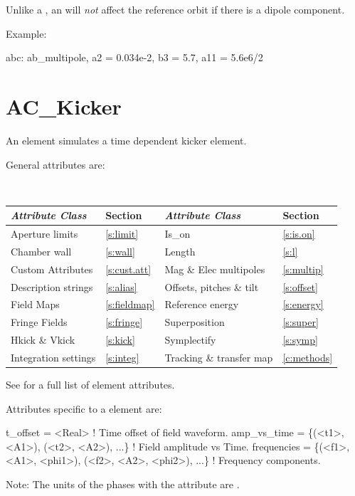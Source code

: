 Unlike a , an  will {\em not} affect the
reference orbit if there is a dipole component. 

Example:
\begin{example}
  abc: ab_multipole, a2 = 0.034e-2, b3 = 5.7, a11 = 5.6e6/2
\end{example}

\section{AC_Kicker}
\label{s:ac.kick}

An  element simulates a time dependent kicker element.

General  attributes are:
\begin{center}
\tt
\begin{tabular}{llll} \toprule
  {\sl Attribute Class}      & Section           & {\sl Attribute Class}      & Section         \\ \midrule
  Aperture limits            & \ref{s:limit}     & Is_on                      & \ref{s:is.on}   \\
  Chamber wall               & \ref{s:wall}      & Length                     & \ref{s:l}       \\
  Custom Attributes          & \ref{s:cust.att}  & Mag \& Elec multipoles     & \ref{s:multip}  \\
  Description strings        & \ref{s:alias}     & Offsets, pitches \& tilt   & \ref{s:offset}  \\
  Field Maps                 & \ref{s:fieldmap}  & Reference energy           & \ref{s:energy}  \\ 
  Fringe Fields              & \ref{s:fringe}    & Superposition              & \ref{s:super}   \\
  Hkick \& Vkick             & \ref{s:kick}      & Symplectify                & \ref{s:symp}    \\
  Integration settings       & \ref{s:integ}     & Tracking \& transfer map   & \ref{c:methods} \\
  \bottomrule
\end{tabular}
\end{center}
\toffset
See  for a full list of element attributes.

Attributes specific to a  element are:
\begin{example}
  t_offset   = <Real>                                      ! Time offset of field waveform.
  amp_vs_time = \{(<t1>, <A1>), (<t2>, <A2>), ...\}          ! Field amplitude vs Time.
  frequencies = \{(<f1>, <A1>, <phi1>), (<f2>, <A2>, <phi2>), ...\} ! Frequency components.
\end{example}
Note: The units of the phases  with the  attribute are .

